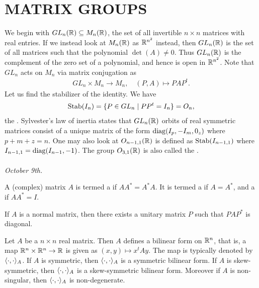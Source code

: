 \chapter{MATRIX GROUPS}

We begin with $GL_{n}(\mathbb{R}) \subseteq M_{n}(\mathbb{R})$, the set of all invertible $n \times n$ matrices with real entries. If we instead look at $M_{n}(\mathbb{R})$ as $\mathbb{R}^{n^{2}}$ instead, then $GL_{n}(\mathbb{R})$ is the set of all matrices such that the polynomial $\det(A) \neq 0$. Thus $GL_{n}(\mathbb{R})$ is the complement of the zero set of a polynomial, and hence is open in $\mathbb{R}^{n^{2}}$. Note that $GL_{n}$ acts on $M_{n}$ via matrix conjugation as
\begin{align}
    GL_{n} \times M_{n} \to M_{n}, \quad (P,A) \mapsto PAP^{t}.
\end{align}
Let us find the stabilizer of the identity. We have
\begin{align}
    \operatorname{Stab} (I_{n}) = \{P \in GL_{n} \mid PP^{t} = I_{n}\} = O_{n},
\end{align}
the . Sylvester's law of inertia states that $GL_{n}(\mathbb{R})$ orbits of real symmetric matrices consist of a unique matrix of the form $\operatorname{diag}(I_{p},-I_{m},0_{z})$ where $p+m+z = n$. One may also look at $O_{n-1,1}(\mathbb{R})$ is defined as $\operatorname{Stab} (I_{n-1,1})$ where $I_{n-1,1} = \operatorname{diag}(I_{n-1},-1)$. The group $O_{3,1}(\mathbb{R})$ is also called the .\\ \\
\textit{October 9th.}

\begin{definition}
    A (complex) matrix $A$ is termed a  if $AA^{\ast} = A^{\ast}A$. It is termed a  if $A = A^{\ast}$, and a  if $AA^{\ast} = I$.
\end{definition}

\begin{theorem}
    If $A$ is a normal matrix, then there exists a unitary matrix $P$ such that $PAP^{\ast}$ is diagonal.
\end{theorem}

Let $A$ be a $n \times n$ real matrix. Then $A$ defines a bilinear form on $\mathbb{R}^{n}$, that is, a map $\mathbb{R}^{n} \times \mathbb{R}^{n} \to \mathbb{R}$ is given as $(x,y) \mapsto x^{t}Ay$. The map is typically denoted by $\langle\cdot,\cdot\rangle_{A}$. If $A$ is symmetric, then $\langle\cdot,\cdot\rangle_{A}$ is a symmetric bilinear form. If $A$ is skew-symmetric, then $\langle\cdot,\cdot\rangle_{A}$ is a skew-symmetric bilinear form. Moreover if $A$ is non-singular, then $\langle\cdot,\cdot\rangle_{A}$ is non-degenerate. 

